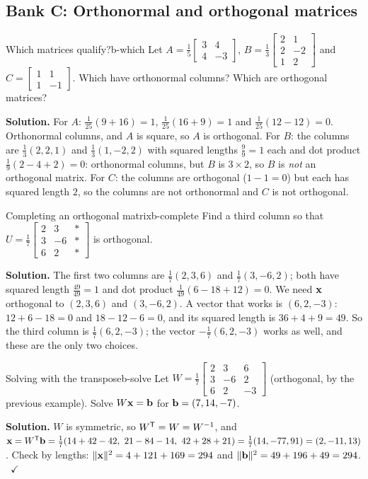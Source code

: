 \documentclass[11pt]{article}
\begin{document}
\subsection*{Bank C: Orthonormal and orthogonal matrices}
\begin{exmp}{Which matrices qualify?}{b-which}
Let $A=\tfrac15\begin{bmatrix}3&4\\4&-3\end{bmatrix}$, $B=\tfrac13\begin{bmatrix}2&1\\2&-2\\1&2\end{bmatrix}$ and $C=\begin{bmatrix}1&1\\1&-1\end{bmatrix}$. Which have orthonormal columns? Which are orthogonal matrices?

\textbf{Solution.} For $A$: $\tfrac1{25}(9+16)=1$, $\tfrac1{25}(16+9)=1$ and $\tfrac1{25}(12-12)=0$. Orthonormal columns, and $A$ is square, so $A$ is orthogonal. For $B$: the columns are $\tfrac13(2,2,1)$ and $\tfrac13(1,-2,2)$ with squared lengths $\tfrac99=1$ each and dot product $\tfrac19(2-4+2)=0$: orthonormal columns, but $B$ is $3\times2$, so $B$ is \emph{not} an orthogonal matrix. For $C$: the columns are orthogonal ($1-1=0$) but each has squared length $2$, so the columns are not orthonormal and $C$ is not orthogonal.
\end{exmp}

\begin{exmp}{Completing an orthogonal matrix}{b-complete}
Find a third column so that $U=\tfrac17\begin{bmatrix}2&3&*\\3&-6&*\\6&2&*\end{bmatrix}$ is orthogonal.

\textbf{Solution.} The first two columns are $\tfrac17(2,3,6)$ and $\tfrac17(3,-6,2)$; both have squared length $\tfrac{49}{49}=1$ and dot product $\tfrac1{49}(6-18+12)=0$. We need $\mathbf{x}$ orthogonal to $(2,3,6)$ and $(3,-6,2)$. A vector that works is $(6,2,-3)$: $12+6-18=0$ and $18-12-6=0$, and its squared length is $36+4+9=49$. So the third column is $\tfrac17(6,2,-3)$; the vector $-\tfrac17(6,2,-3)$ works as well, and these are the only two choices.
\end{exmp}

\begin{exmp}{Solving with the transpose}{b-solve}
Let $W=\tfrac17\begin{bmatrix}2&3&6\\3&-6&2\\6&2&-3\end{bmatrix}$ (orthogonal, by the previous example). Solve $W\mathbf{x}=\mathbf{b}$ for $\mathbf{b}=(7,14,-7)$.

\textbf{Solution.} $W$ is symmetric, so $W^{\mathsf T}=W=W^{-1}$, and $\bv{x}=W\T\bv{b}=\tfrac17(14+42-42,\ 21-84-14,\ 42+28+21)=\tfrac17(14,-77,91)=(2,-11,13)$. Check by lengths: $\lVert\mathbf{x}\rVert^2=4+121+169=294$ and $\lVert\mathbf{b}\rVert^2=49+196+49=294$. \ $\checkmark$
\end{exmp}
\end{document}
